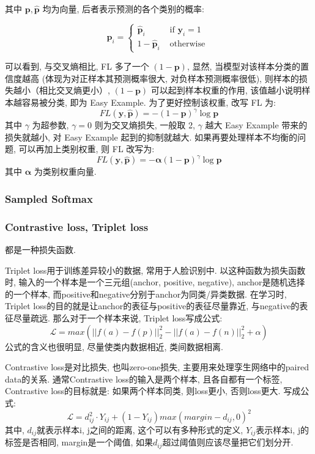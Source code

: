 其中 $\boldsymbol{p}, \hat{\boldsymbol{p}}$ 均为向量, 后者表示预测的各个类别的概率:

$$
\boldsymbol{p}_i= \begin{cases}
		\hat{\boldsymbol{p}}_i & \text { if } \boldsymbol{y}_i=1 \\ 
		1-\hat{\boldsymbol{p}}_i & \text { otherwise }
	\end{cases}
$$

可以看到, 与交叉熵相比, FL 多了一个 $(1-\boldsymbol{p})$, 显然, 当模型对该样本分类的置信度越高 (体现为对正样本其预测概率很大, 对负样本预测概率很低), 则样本的损失越小（相比交叉熵更小）, $(1-\boldsymbol{p})$ 可以起到样本权重的作用, 该值越小说明样本越容易被分类, 即为 Easy Example. 为了更好控制该权重, 改写 FL 为: 
$$
FL(\boldsymbol{y}, \hat{\boldsymbol{p}}) = -(1-\boldsymbol{p})^\gamma \log \boldsymbol{p}
$$
其中 $\gamma$ 为超参数, $\gamma=0$ 则为交叉熵损失, 一般取 2, $\gamma$ 越大 Easy Example 带来的损失就越小, 对 Easy Example 起到的抑制就越大. 如果再要处理样本不均衡的问题, 可以再加上类别权重, 则 FL 改写为: 
$$
FL(\boldsymbol{y}, \hat{\boldsymbol{p}}) = - \boldsymbol{\alpha} (1-\boldsymbol{p})^\gamma \log \boldsymbol{p}
$$
其中 $\boldsymbol{\alpha}$ 为类别权重向量. 

\subsubsection{Sampled Softmax}

\subsubsection{Contrastive loss, Triplet loss} 
都是一种损失函数. 

Triplet loss用于训练差异较小的数据, 常用于人脸识别中. 以这种函数为损失函数时, 输入的一个样本是一个三元组(anchor, positive, negative), anchor是随机选择的一个样本, 而positive和negative分别于anchor为同类/异类数据. 在学习时, Triplet loss的目的就是让anchor的表征与positive的表征尽量靠近, 与negative的表征尽量疏远. 那么对于一个样本来说, Triplet loss写成公式:  
$$
\mathcal{L} = max( ||f(a)-f(p)||_2^2 - ||f(a) - f(n)||_2^2 + \alpha )
$$
公式的含义也很明显, 尽量使类内数据相近, 类间数据相离. 

Contrastive loss是对比损失, 也叫zero-one损失, 主要用来处理孪生网络中的paired data的关系. 通常Contrastive loss的输入是两个样本, 且各自都有一个标签, Contrastive loss的目标就是: 如果两个样本同类, 则loss更小, 否则loss更大. 写成公式: 
$$
\mathcal{L} = d_{ij}^2 \cdot Y_{ij} + (1 - Y_{ij} )max(margin - d_{ij}, 0)^2
$$
其中, $d_{ij}$就表示样本i, j之间的距离, 这个可以有多种形式的定义, $Y_{ij}$表示样本i, j的标签是否相同, margin是一个阈值, 如果$d_{ij}$超过阈值则应该尽量把它们划分开. 

